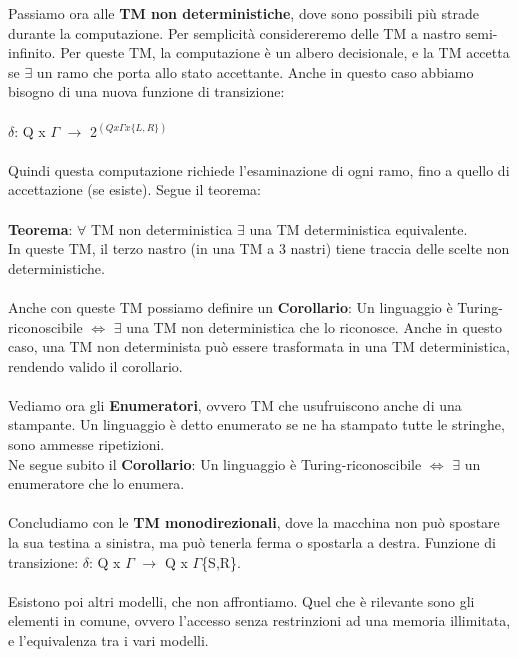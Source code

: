 \documentclass[]{article}
\begin{document}
				Passiamo ora alle \textbf{TM non deterministiche}, dove sono possibili più strade durante la computazione. Per semplicità considereremo delle TM a nastro semi-infinito. Per queste TM, la computazione è un albero decisionale, e la TM accetta se $\exists$ un ramo che porta allo stato accettante. Anche in questo caso abbiamo bisogno di una nuova funzione di transizione:\\\\
				$\delta$: Q x $\Gamma$ $\rightarrow$ 2$^{(Qx \Gamma x\{L,R\})}$\\\\
				Quindi questa computazione richiede l'esaminazione di ogni ramo, fino a quello di accettazione (se esiste). Segue il teorema:\\\\
				\textbf{Teorema}: $\forall$ TM non deterministica $\exists$ una TM deterministica equivalente.\\
				In queste TM, il terzo nastro (in una TM a 3 nastri) tiene traccia delle scelte non deterministiche.\\\\
				Anche con queste TM possiamo definire un \textbf{Corollario}: Un linguaggio è Turing-riconoscibile $\Leftrightarrow$ $\exists$ una TM non deterministica che lo riconosce. Anche in questo caso, una TM non determinista può essere trasformata in una TM deterministica, rendendo valido il corollario.\\\\
				Vediamo ora gli \textbf{Enumeratori}, ovvero TM che usufruiscono anche di una stampante. Un linguaggio è detto enumerato se ne ha stampato tutte le stringhe, sono ammesse ripetizioni.\\
				Ne segue subito il \textbf{Corollario}: Un linguaggio è Turing-riconoscibile $\Leftrightarrow$ $\exists$ un enumeratore che lo enumera.\\\\
				Concludiamo con le \textbf{TM monodirezionali}, dove la macchina non può spostare la sua testina a sinistra, ma può tenerla ferma o spostarla a destra. Funzione di transizione: $\delta$: Q x $\Gamma$ $\rightarrow$ Q x $\Gamma$\{S,R\}.\\\\
				Esistono poi altri modelli, che non affrontiamo. Quel che è rilevante sono gli elementi in comune, ovvero l'accesso senza restrinzioni ad una memoria illimitata, e l'equivalenza tra i vari modelli.
\end{document}

